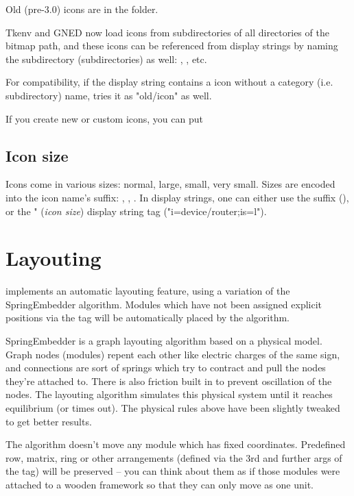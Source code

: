 Old (pre-3.0) icons are in the  folder.

Tkenv and GNED now load icons from subdirectories of all directories
of the bitmap path, and these icons can be referenced from display strings
by naming the subdirectory (subdirectories) as well:
, , etc.

For compatibility, if the display string contains a icon without
a category (i.e. subdirectory) name, {\opp} tries it as "old/icon" as well.

If you create new or custom icons, you can put

\subsection{Icon size}

Icons come in various sizes: normal, large, small, very small. Sizes are
encoded into the icon name's suffix: , , .
In display strings, one can either use the suffix (),
or the " (\textit{icon size}) display string tag ("i=device/router;is=l").


\section{Layouting}
\label{sec:ch-graphics:layouting}

{\opp} implements an automatic layouting feature, using
a variation of the SpringEmbedder algorithm. Modules which have
not been assigned explicit positions via the  tag will be
automatically placed by the algorithm.

SpringEmbedder is a graph layouting algorithm based on a physical model.
Graph nodes (modules) repent each other like electric charges
of the same sign, and connections are sort of springs which try
to contract and pull the nodes they're attached to. There is also friction
built in to prevent oscillation of the nodes. The layouting algorithm
simulates this physical system until it reaches equilibrium
(or times out). The physical rules above have been slightly tweaked
to get better results.

The algorithm doesn't move any module which has fixed coordinates.
Predefined row, matrix, ring or other arrangements (defined
via the 3rd and further args of the  tag) will be preserved --
you can think about them as if those modules were attached
to a wooden framework so that they can only move as one unit.

